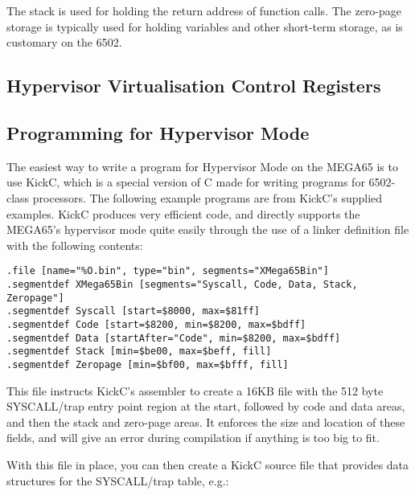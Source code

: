 The stack is used for holding the return address of function calls.  The zero-page storage is typically used for holding
variables and other short-term storage, as is customary on the 6502.

\subsection{Hypervisor Virtualisation Control Registers}



\subsection{Programming for Hypervisor Mode}

The easiest way to write a program for Hypervisor Mode on the MEGA65 is to use KickC, which is a special version of C
made for writing programs for 6502-class processors.  The following example programs are from KickC's supplied examples.
KickC produces very efficient code, and directly supports the MEGA65's
hypervisor mode quite easily through the use of a linker definition file with the following contents:

\begin{tcolorbox}[colback=black,coltext=white]
\verbatimfont{\codefont}
\begin{verbatim}
.file [name="%
.segmentdef XMega65Bin [segments="Syscall, Code, Data, Stack, Zeropage"]
.segmentdef Syscall [start=$8000, max=$81ff]
.segmentdef Code [start=$8200, min=$8200, max=$bdff]
.segmentdef Data [startAfter="Code", min=$8200, max=$bdff]
.segmentdef Stack [min=$be00, max=$beff, fill]
.segmentdef Zeropage [min=$bf00, max=$bfff, fill]
\end{verbatim}
\end{tcolorbox}

This file instructs KickC's assembler to create a 16KB file with the 512 byte SYSCALL/trap entry point region at the start,
followed by code and data areas, and then the stack and zero-page areas. It enforces the size and location of these fields, and
will give an error during compilation if anything is too big to fit.

With this file in place, you can then create a KickC source file that provides data structures for the SYSCALL/trap table, e.g.:

